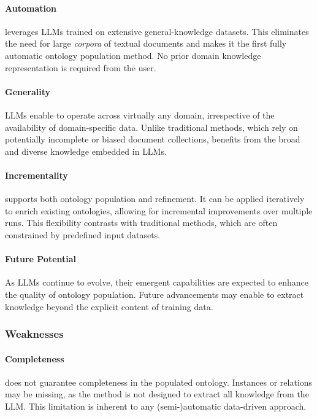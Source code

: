 \paragraph{Automation}
%
\llmfkg{} leverages \glspl{LLM} trained on extensive general-knowledge datasets.
%
This eliminates the need for large \emph{corpora} of textual documents and makes it the first fully automatic ontology population method.
%
No prior domain knowledge representation is required from the user.

\paragraph{Generality}
%
\glspl{LLM} enable \llmfkg{} to operate across virtually any domain, irrespective of the availability of domain-specific data.
%
Unlike traditional methods, which rely on potentially incomplete or biased document collections, \llmfkg{} benefits from the broad and diverse knowledge embedded in \glspl{LLM}.

\paragraph{Incrementality}
%
\llmfkg{} supports both ontology population and refinement.
%
It can be applied iteratively to enrich existing ontologies, allowing for incremental improvements over multiple runs.
%
This flexibility contrasts with traditional methods, which are often constrained by predefined input datasets.

\paragraph{Future Potential}

As \glspl{LLM} continue to evolve, their emergent capabilities are expected to enhance the quality of ontology population.
%
Future advancements may enable \llmfkg{} to extract knowledge beyond the explicit content of training data.

\subsubsection{Weaknesses}
\label{subsubsec:weaknesses}
%
\paragraph{Completeness}
%
\llmfkg{} does not guarantee completeness in the populated ontology.
%
Instances or relations may be missing, as the method is not designed to extract all knowledge from the \gls{LLM}.
%
This limitation is inherent to any (semi-)automatic data-driven approach.

